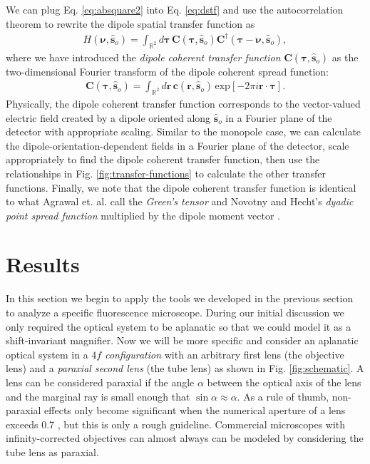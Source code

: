 \documentclass[]{osa-article}
\providecommand{\mb}[1]{\mathbf{#1}}
\providecommand{\so}{\mathbf{\hat{s}}_o}
\providecommand{\mbb}[1]{\mathbb{#1}}
\providecommand{\bs}[1]{\boldsymbol{#1}}
\providecommand{\bv}{\bs{\nu}}
\providecommand{\taup}{\bs{\tau}}
\begin{document}
We can plug Eq. \eqref{eq:absquare2} into Eq. \eqref{eq:dstf} and use the
autocorrelation theorem to rewrite the dipole spatial transfer function as
\begin{align}
  H(\bv, \so) = \int_{\mbb{R}^2}d\taup\,\mb{C}(\taup, \so)\mb{C}^\dagger(\taup - \bv, \so), 
\end{align}
where we have introduced the \textit{dipole coherent transfer function}
$\mb{C}(\taup, \so)$ as the two-dimensional Fourier transform of the dipole
coherent spread function:
\begin{align}
  \mb{C}(\taup, \so) = \int_{\mbb{R}^2}d\mb{r}\, \mb{c}(\mb{r}, \so)\,\text{exp}[-2\pi i\mb{r}\cdot\taup].
\end{align}
Physically, the dipole coherent transfer function corresponds to the
vector-valued electric field created by a dipole oriented along $\so$ in a
Fourier plane of the detector with appropriate scaling. Similar to the monopole
case, we can calculate the dipole-orientation-dependent fields in a Fourier
plane of the detector, scale appropriately to find the dipole coherent transfer
function, then use the relationships in Fig. \ref{fig:transfer-functions} to
calculate the other transfer functions. Finally, we note that the dipole
coherent transfer function is identical to what Agrawal et. al. call the
\textit{Green's tensor} \cite{agrawal2012} and Novotny and Hecht's
\textit{dyadic point spread function} multiplied by the dipole moment vector
\cite{nov2006}.

\section{Results}\label{sec:results}
In this section we begin to apply the tools we developed in the previous section
to analyze a specific fluorescence microscope. During our initial discussion we
only required the optical system to be aplanatic so that we could model it as a
shift-invariant magnifier. Now we will be more specific and consider an
aplanatic optical system in a \textit{$\mathit{4}f$ configuration} with an
arbitrary first lens (the objective lens) and a \textit{paraxial second lens}
(the tube lens) as shown in Fig. \ref{fig:schematic}. A lens can be considered
paraxial if the angle $\alpha$ between the optical axis of the lens and the
marginal ray is small enough that $\sin\alpha \approx \alpha$. As a rule of
thumb, non-paraxial effects only become significant when the numerical aperture
of a lens exceeds 0.7 \cite[ch.~6]{gu2000}, but this is only a rough
guideline. Commercial microscopes with infinity-corrected objectives can almost
always can be modeled by considering the tube lens as paraxial. 
\end{document}
